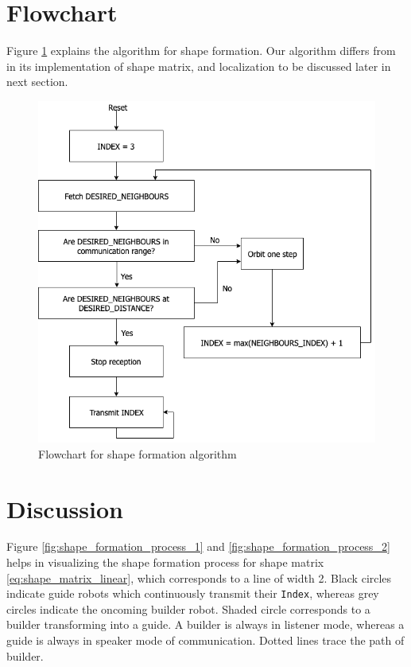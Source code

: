 \documentclass{report}[12pt]
\begin{document}
\section{Flowchart}
Figure \ref{fig:fc_shape_form} explains the algorithm for shape formation. Our algorithm differs from \cite{MR-AC-RN:2014} in its implementation of shape matrix, and localization to be discussed later in next section.
\begin{figure}[H]
	\centering
	\includegraphics[scale=0.6]{images/shape_formation}
	\caption{Flowchart for shape formation algorithm}
	\label{fig:fc_shape_form}
\end{figure}

\section{Discussion}
Figure \ref{fig:shape_formation_process_1} and \ref{fig:shape_formation_process_2} helps in visualizing the shape formation process for shape matrix \eqref{eq:shape_matrix_linear}, which corresponds to a line of width 2. Black circles indicate guide robots which continuously transmit their \texttt{Index}, whereas grey circles indicate the oncoming builder robot. Shaded circle corresponds to a builder transforming into a guide. A builder is always in listener mode, whereas a guide is always in speaker mode of communication. Dotted lines trace the path of builder.
\end{document}
